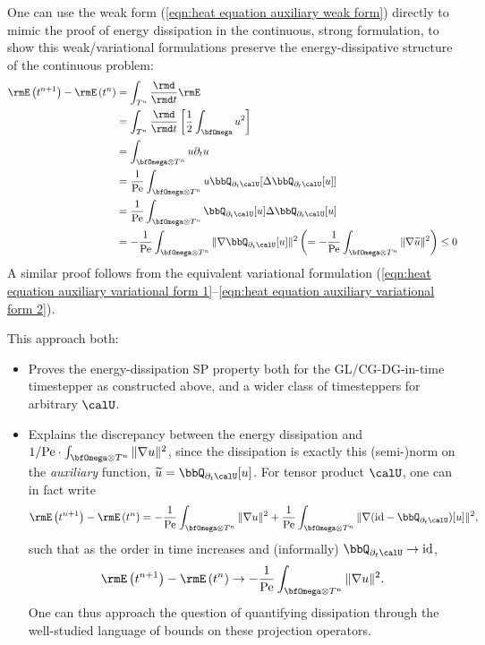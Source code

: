     One can use the weak form (\ref{eqn:heat equation auxiliary weak form}) directly to mimic the proof of energy dissipation in the continuous, strong formulation, to show this weak/variational formulations preserve the energy-dissipative structure of the continuous problem:
    \begin{align}
        \rmE\left(t^{n + 1}\right) - \rmE\left(t^{n}\right)  &=  \int_{T^{n}}\frac{\rmd}{\rmd t}\rmE  \\
        &=  \int_{T^{n}}\frac{\rmd}{\rmd t}\left[\frac{1}{2}\int_{\bfOmega}u^{2}\right]  \\
        &=  \int_{\bfOmega\otimes T^{n}}u\partial_{t}u  \\
        &=  \frac{1}{\rmPe}\int_{\bfOmega\otimes T^{n}}u\bbQ_{\partial_{t}\calU}[\Delta\bbQ_{\partial_{t}\calU}[u]]  \\
        &=  \frac{1}{\rmPe}\int_{\bfOmega\otimes T^{n}}\bbQ_{\partial_{t}\calU}[u]\Delta\bbQ_{\partial_{t}\calU}[u]  \\
        &=  - \frac{1}{\rmPe}\int_{\bfOmega\otimes T^{n}}\|\nabla\bbQ_{\partial_{t}\calU}[u]\|^{2}  \left(=  - \frac{1}{\rmPe}\int_{\bfOmega\otimes T^{n}}\|\nabla\widetilde{u}\|^{2}\right)  \leq  0
    \end{align}
    A similar proof follows from the equivalent variational formulation (\ref{eqn:heat equation auxiliary variational form 1}--\ref{eqn:heat equation auxiliary variational form 2}).

    This approach both:
    \begin{itemize}
        \item  Proves the energy-dissipation SP property both for the GL/CG-DG-in-time timestepper as constructed above, and a wider class of timesteppers for arbitrary $\calU$. 
        \item  Explains the discrepancy between the energy dissipation and $1/\rmPe\cdot\int_{\bfOmega\otimes T^{n}}\|\nabla u\|^{2}$, since the dissipation is exactly this (semi-)norm on the \emph{auxiliary} function, $\widetilde{u}  =  \bbQ_{\partial_{t}\calU}[u]$. For tensor product $\calU$, one can in fact write
        \begin{equation}
            \rmE\left(t^{n + 1}\right) - \rmE\left(t^{n}\right)  =  - \frac{1}{\rmPe}\int_{\bfOmega\otimes T^{n}}\|\nabla u\|^{2} + \frac{1}{\rmPe}\int_{\bfOmega\otimes T^{n}}\|\nabla(\id - \bbQ_{\partial_{t}\calU})[u]\|^{2},
        \end{equation}
        such that as the order in time increases and (informally) $\bbQ_{\partial_{t}\calU}  \rightarrow  \id$,
        \begin{equation}
            \rmE\left(t^{n + 1}\right) - \rmE\left(t^{n}\right)  \rightarrow  - \frac{1}{\rmPe}\int_{\bfOmega\otimes T^{n}}\|\nabla u\|^{2}.
        \end{equation}
        One can thus approach the question of quantifying dissipation through the well-studied language of bounds on these projection operators.
    \end{itemize}

